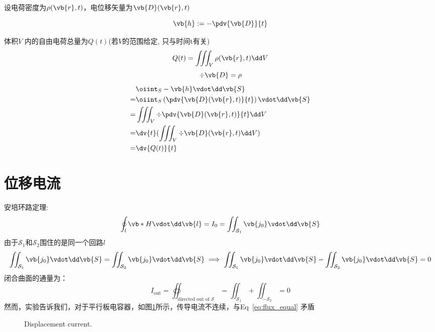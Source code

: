 
设电荷密度为$\rho(\vb{r}, t)$，电位移矢量为$\vb{D}(\vb{r},t)$
\begin{definition}[流密度]
	\begin{equation}
		\vb{h} := - \pdv{\vb{D}}{t}
	\end{equation}
\end{definition}
体积$V$ 内的自由电荷总量为$Q(t)$(若$V$的范围给定, 只与时间t有关)
\begin{equation}
	Q(t)=\iiint_V \rho(\vb{r},t) \dd V
\end{equation}
\begin{equation}
	\div \vb{D} = \rho
\end{equation}
\begin{equation}
	\begin{aligned}
		  & \oiint_S - \vb{h} \vdot \dd \vb{S}                               \\
		= & \oiint_S \left(\pdv{\vb{D}(\vb{r},t)}{t}\right) \vdot \dd \vb{S} \\ %
		= & \iiint_V \div \pdv{\vb{D}(\vb{r},t)}{t} \dd V                    \\
		= & \dv{t}( \iiint_V \div \vb{D}(\vb{r},t)  \dd V)                   \\
		= & \dv{Q(t)}{t}
	\end{aligned}
\end{equation}

\section{位移电流}%
安培环路定理:
\begin{equation}
	\label{eq:安培环路定理}
	\oint_l \vb*{H} \vdot \dd \vb{l} = I_0 = \iint_{\mathcal{S}_1} \vb{j_0} \vdot \dd \vb{S}
\end{equation}
由于$\mathcal{S}_1$和$\mathcal{S}_2$围住的是同一个回路$l$
\begin{equation}
	\label{eq:flux_equal}
	\iint_{\mathcal{S}_1} \vb{j_0} \vdot \dd \vb{S}= \iint_{\mathcal{S}_2} \vb{j_0} \vdot \dd \vb{S}
	\implies
	\iint_{\mathcal{S}_1} \vb{j_0} \vdot \dd \vb{S}- \iint_{\mathcal{S}_2} \vb{j_0} \vdot \dd \vb{S} =0
\end{equation}
闭合曲面的通量为：
\begin{equation}
	I_{\text{out}} = \oiint_{\text{directed out of } \mathcal{S}} =\iint_{\mathcal{S}_1} + \iint_{-\mathcal{S}_2} = 0
\end{equation}
然而，实验告诉我们，对于平行板电容器，如图\ref{fig:displayment-current}所示，传导电流不连续，与Eq~\eqref{eq:flux_equal} 矛盾
\begin{figure}[ht]
	\centering
	
	\caption{Displacement current.}
	\label{fig:displayment-current}
\end{figure}

